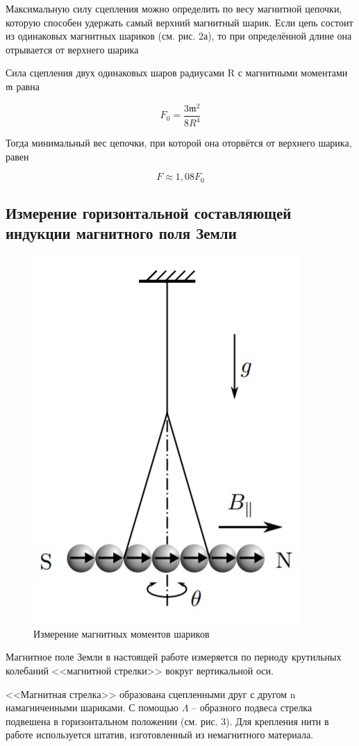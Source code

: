 \documentclass[a4paper,12pt]{article}
\begin{document}
Максимальную силу сцепления можно
определить по весу магнитной цепочки, которую способен удержать самый верхний магнитный шарик. Если цепь состоит из одинаковых магнитных шариков (см. рис. 2а), то при определённой длине она отрывается от верхнего шарика

Сила сцепления двух одинаковых шаров радиусами R с магнитными моментами $\mathfrak{m}$ равна

\begin{equation}
	F_0 = \frac{3 \mathfrak{m}^2}{8R^4} \label{force}
\end{equation}

Тогда минимальный вес цепочки, при которой она оторвётся от верхнего шарика, равен

\begin{equation}
F \approx 1,08 F_0
\end{equation}

\newpage

\subsection*{Измерение горизонтальной составляющей индукции магнитного поля Земли}

\begin{figure}
\includegraphics[width = 5 cm, height = 7 cm]{fig3}
\caption{Измерение магнитных моментов шариков}
\end{figure}

Магнитное поле Земли в настоящей работе измеряется по периоду
крутильных колебаний <<магнитной стрелки>> вокруг вертикальной оси.

<<Магнитная стрелка>> образована сцепленными друг с другом n намагниченными
шариками. С помощью $\Lambda$ -- образного подвеса
стрелка подвешена в горизонтальном положении (см. рис. 3). Для крепления нити в
работе используется штатив, изготовленный
из немагнитного материала.
\end{document}
